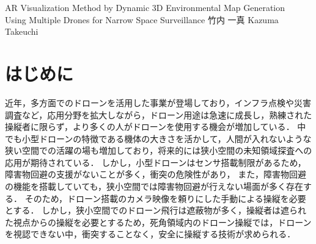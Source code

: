 \documentclass[a4paper,10pt,twocolumn,uplatex]{jsarticle}
\date{5}
\begin{document}
{AR Visualization Method by Dynamic 3D Environmental Map Generation\\ Using Multiple Drones for Narrow Space Surveillance}
{竹内 一真}
{Kazuma Takeuchi}


\section{はじめに}
近年，多方面でのドローンを活用した事業が登場しており，インフラ点検や災害調査など，応用分野を拡大しながら，ドローン用途は急速に成長し，熟練された操縦者に限らず，より多くの人がドローンを使用する機会が増加している\cite{Nonami}．
中でも小型ドローンの特徴である機体の大きさを活かして，人間が入れないような狭い空間での活躍の場も増加しており，将来的には狭小空間の未知領域探査への応用が期待されている．
しかし，小型ドローンはセンサ搭載制限があるため，障害物回避の支援がないことが多く，衝突の危険性があり，
また，障害物回避の機能を搭載していても，狭小空間では障害物回避が行えない場面が多く存在する\cite{syohou}．
そのため，ドローン搭載のカメラ映像を頼りにした手動による操縦を必要とする．
しかし，狭小空間でのドローン飛行は遮蔽物が多く，操縦者は遮られた視点からの操縦を必要とするため，死角領域内のドローン操縦では，ドローンを視認できない中，衝突することなく，安全に操縦する技術が求められる．
\end{document}

